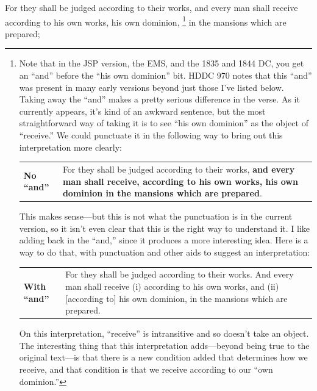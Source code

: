 		For they shall be judged according to their works, and every man shall receive according to his own works, his own dominion,%
			\footnote{%
				Note that in the JSP version, the EMS, and the 1835 and 1844 DC, you get an ``and'' before the ``his own dominion'' bit. HDDC 970 notes that this ``and'' was present in many early versions beyond just those I've listed below. Taking away the ``and'' makes a pretty serious difference in the verse. As it currently appears, it's kind of an awkward sentence, but the most straightforward way of taking it is to see ``his own dominion'' as the object of ``receive.'' We could punctuate it in the following way to bring out this interpretation more clearly:
				
					\begin{tabular}{p{2cm}p{15cm}}
						\textbf{No ``and''} & For they shall be judged according to their works, \textbf{and every man shall receive, according to his own works, his own dominion in the mansions which are prepared}.
					\end{tabular}
					
				This makes sense---but this is not what the punctuation is in the current version, so it isn't even clear that this is the right way to understand it. I like adding back in the ``and,'' since it produces a more interesting idea. Here is a way to do that, with punctuation and other aids to suggest an interpretation:
				
					\begin{tabular}{p{2cm}p{15cm}}
						\textbf{With ``and''} & For they shall be judged according to their works. And every man shall receive (i) according to his own works, and (ii) [according to] his own dominion, in the mansions which are prepared.
					\end{tabular}
					
				On this interpretation, ``receive'' is intransitive and so doesn't take an object. The interesting thing that this interpretation adds---beyond being true to the original text---is that there is a new condition added that determines how we receive, and that condition is that we receive according to our ``own dominion.''
				}
		in the mansions which are prepared;


